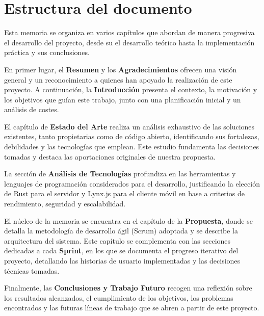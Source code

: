 \section{Estructura del documento}
Esta memoria se organiza en varios capítulos que abordan de manera progresiva el desarrollo del proyecto, desde su el desarrollo teórico hasta la implementación práctica y sus conclusiones.

En primer lugar, el \textbf{Resumen} y los \textbf{Agradecimientos} ofrecen una visión general y un reconocimiento a quienes han apoyado la realización de este proyecto. A continuación, la \textbf{Introducción} presenta el contexto, la motivación y los objetivos que guían este trabajo, junto con una planificación inicial y un análisis de costes.

El capítulo de \textbf{Estado del Arte} realiza un análisis exhaustivo de las soluciones existentes, tanto propietarias como de código abierto, identificando sus fortalezas, debilidades y las tecnologías que emplean. Este estudio fundamenta las decisiones tomadas y destaca las aportaciones originales de nuestra propuesta.

La sección de \textbf{Análisis de Tecnologías} profundiza en las herramientas y lenguajes de programación considerados para el desarrollo, justificando la elección de Rust para el servidor y Lynx.js para el cliente móvil en base a criterios de rendimiento, seguridad y escalabilidad.

El núcleo de la memoria se encuentra en el capítulo de la \textbf{Propuesta}, donde se detalla la metodología de desarrollo ágil (Scrum) adoptada y se describe la arquitectura del sistema. Este capítulo se complementa con las secciones dedicadas a cada \textbf{Sprint}, en los que se documenta el progreso iterativo del proyecto, detallando las historias de usuario implementadas y las decisiones técnicas tomadas.

Finalmente, las \textbf{Conclusiones y Trabajo Futuro} recogen una reflexión sobre los resultados alcanzados, el cumplimiento de los objetivos, los problemas encontrados y las futuras líneas de trabajo que se abren a partir de este proyecto.
